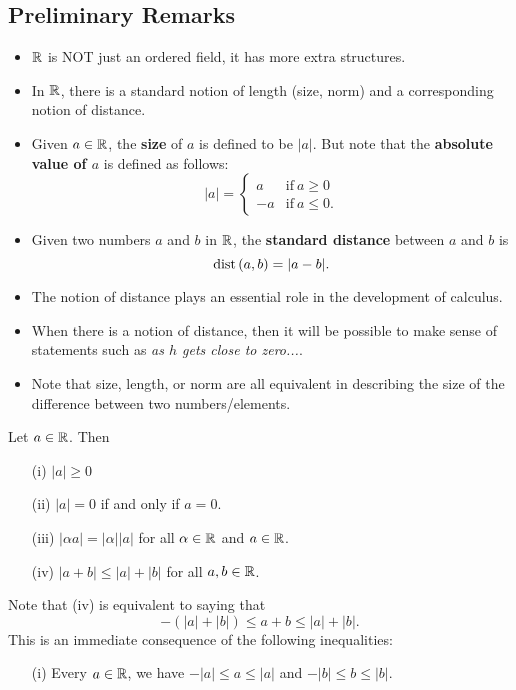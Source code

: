 \documentclass[a4paper]{report}
\begin{document}
\subsection{Preliminary Remarks}

\begin{itemize}
    \item \( \mathbb{R}  \) is NOT just an ordered field, it has more extra structures.
    \item In \( \mathbb{R}  \), there is a standard notion of length (size, norm) and a corresponding notion of distance.
    \item Given \( a \in \mathbb{R}  \), the \textbf{size} of \( a  \) is defined to be \( | a  |  \). But note that the \textbf{absolute value of \( a \)} is defined as follows:
        \[  | a  |  = 
        \begin{cases}
            a &\text{if} \ a \geq 0 \\
            -a &\text{if} \ a \leq 0.
        \end{cases} \]
    \item Given two numbers \( a  \) and \( b  \) in \( \mathbb{R}  \), the \textbf{standard distance} between \( a  \) and \( b  \) is 
        \[  \operatorname{dist}{(a,b)} = | a - b  |.  \]
    \item The notion of distance plays an essential role in the development of calculus.
    \item When there is a notion of distance, then it will be possible to make sense of statements such as \textit{as \( h \) gets close to zero...}. 
    \item Note that size, length, or norm are all equivalent in describing the size of the difference between two numbers/elements.
\end{itemize}

\begin{theorem}
    Let \( a \in \mathbb{R}  \). Then
    \begin{enumerate}
        \item[(i)] \( |  a  |  \geq 0  \)  
        \item[(ii)] \( |  a  |  = 0  \) if and only if \( a = 0  \). 
        \item [(iii)] \( |  \alpha a  |  = | \alpha  |  | a |  \) for all \( \alpha \in \mathbb{R}  \) and \( a \in \mathbb{R}  \).
        \item[(iv)] \( |  a + b  |  \leq | a  |  + | b  |  \) for all \( a,b \in \mathbb{R}  \).
    \end{enumerate}
\end{theorem}
\begin{remark}
    Note that (iv) is equivalent to saying that 
    \[  -(| a | + | b | ) \leq a + b \leq | a  |  + | b  |.  \]
    This is an immediate consequence of the following inequalities:
    \begin{enumerate}
        \item[(i)] Every \( a \in \mathbb{R}  \), we have \( - | a  |  \leq a \leq | a  |  \) and \( - | b  |  \leq b \leq |  b |  \).
    \end{enumerate}
\end{remark}
\end{document}
